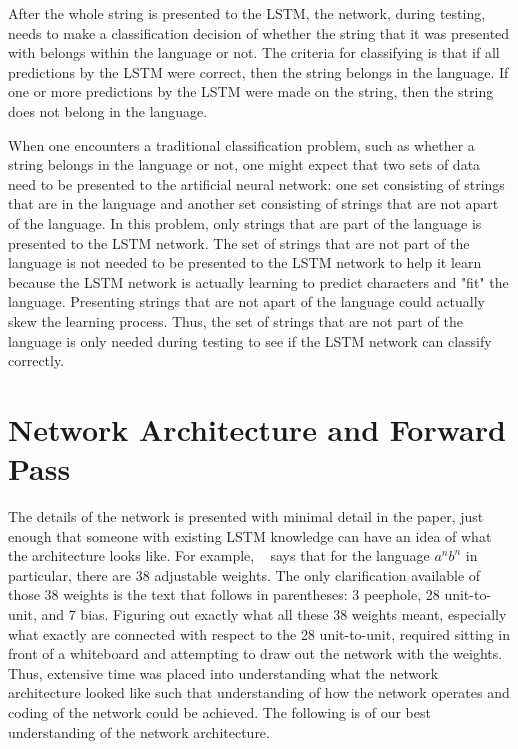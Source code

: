 \documentclass[11pt,letterpaper]{article}
\begin{document}
After the whole string is presented to the LSTM, the network, during testing, needs to make a classification decision of whether the string that it was presented with belongs within the language or not. The criteria for classifying is that if all predictions by the LSTM were correct, then the string belongs in the language. If one or more predictions by the LSTM were made on the string, then the string does not belong in the language.

When one encounters a traditional classification problem, such as whether a string belongs in the language or not, one might expect that two sets of data need to be presented to the artificial neural network: one set consisting of strings that are in the language and another set consisting of strings that are not apart of the language. In this problem, only strings that are part of the language is presented to the LSTM network. The set of strings that are not part of the language is not needed to be presented to the LSTM network to help it learn because the LSTM network is actually learning to predict characters and "fit" the language. Presenting strings that are not apart of the language could actually skew the learning process. Thus, the set of strings that are not part of the language is only needed during testing to see if the LSTM network can classify correctly. 

\section{Network Architecture and Forward Pass}
The details of the network is presented with minimal detail in the paper, just enough that someone with existing LSTM knowledge can have an idea of what the architecture looks like. For example, ~\cite{Gers:01} says that for the language $a^nb^n$ in particular, there are 38 adjustable weights. The only clarification available of those 38 weights is the text that follows in parentheses: 3 peephole, 28 unit-to-unit, and 7 bias. Figuring out exactly what all these 38 weights meant, especially what exactly are connected with respect to the 28 unit-to-unit, required sitting in front of a whiteboard and attempting to draw out the network with the weights.  Thus, extensive time was placed into understanding what the network architecture looked like such that understanding of how the network operates and coding of the network could be achieved. The following is of our best understanding of the network architecture.
\end{document}
